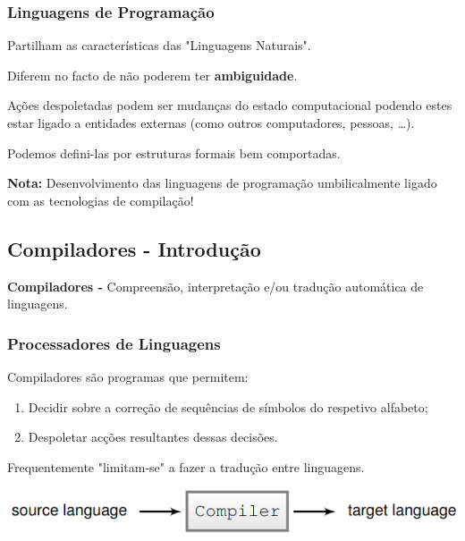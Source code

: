 \documentclass{article}
\begin{document}
\subsubsection{Linguagens de Programação}

\begin{flushleft}
  \item Partilham as características das "Linguagens Naturais".
  \item Diferem no facto de não poderem ter \textbf{ambiguidade}.
  \item Ações despoletadas podem ser mudanças do estado computacional podendo estes estar ligado a entidades externas (como outros computadores, pessoas, \dots).
  \item Podemos defini-las por estruturas formais bem comportadas. 
\end{flushleft}

\begin{flushleft}
  \textbf{Nota:} Desenvolvimento das linguagens de programação umbilicalmente ligado com as tecnologias de compilação!
\end{flushleft}

\subsection{Compiladores - Introdução}

\begin{flushleft}
  \textbf{Compiladores -} Compreensão, interpretação e/ou tradução automática de
  linguagens.
\end{flushleft}

\subsubsection{Processadores de Linguagens}

Compiladores são programas que permitem:
\begin{enumerate}
  \item Decidir sobre a correção de sequências de símbolos do
  respetivo alfabeto;
  \item Despoletar acções resultantes dessas decisões.
\end{enumerate}

\pagebreak

Frequentemente "limitam-se" a fazer a tradução entre linguagens.

\begin{center}
  \includegraphics[scale=0.4]{1}
\end{center}
\end{document}
